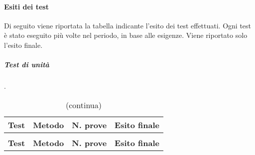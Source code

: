 		\paragraph{Esiti dei test}
	
		Di seguito viene riportata la tabella indicante l'esito dei test effettuati. Ogni test è stato eseguito più volte nel periodo, in base alle esigenze. Viene riportato solo l'esito finale.
		
		\subparagraph{Test di unità} {\color{white}.}
		
\renewcommand{\arraystretch}{1.5}
	
	\begin{longtable}{ >{\centering}p{}  >{\centering}p{} >{\centering}p{}
			>{\centering}p{}}
			
		\caption{   Esito test di unità - RQ}\\	
		\rowcolorhead
		\centering\textbf{\color{white}Test} 
		& \centering\textbf{\color{white}Metodo} 
		& \centering\textbf{\color{white}N. prove}
		& \centering\textbf{\color{white}Esito finale}
		
		\tabularnewline %
		\endfirsthead	
		
		\rowcolor{white}\caption[]{(continua)}\\	
		\rowcolorhead
		\centering\textbf{\color{white}Test} 
		& \centering\textbf{\color{white}Metodo} 
		& \centering\textbf{\color{white}N. prove}
		& \centering\textbf{\color{white}Esito finale}
		
		\tabularnewline %
		\endhead	
		

\end{longtable}
